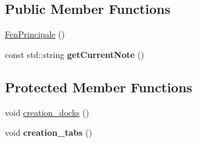 \subsection*{Public Member Functions}
\begin{DoxyCompactItemize}
\item 
\hyperlink{class_fen_principale_a529a35ea032da250ad37f7355d1388be}{Fen\+Principale} ()
\item 
\mbox{\label{class_fen_principale_a29bdfee5e7a363a205932eeb721dab51}} 
const std\+::string {\bfseries get\+Current\+Note} ()
\end{DoxyCompactItemize}
\subsection*{Protected Member Functions}
\begin{DoxyCompactItemize}
\item 
void \hyperlink{class_fen_principale_ab3ef99b1adb06c0bcc57ea74ca34923e}{creation\+\_\+docks} ()
\item 
\mbox{\label{class_fen_principale_aa5ea82e9b0e1c9f93d496cad531ca9e1}} 
void {\bfseries creation\+\_\+tabs} ()
\end{DoxyCompactItemize}
